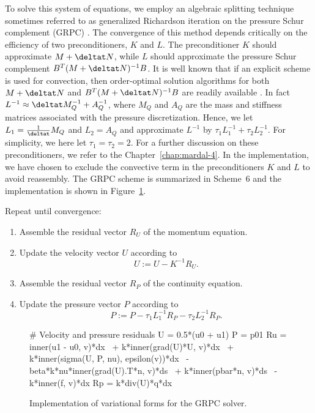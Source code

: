 To solve this system of equations, we employ an algebraic splitting
technique sometimes referred to as generalized Richardson iteration on
the pressure Schur complement (GRPC) \citep{Turek1999}. The
convergence of this method depends critically on the efficiency of two
preconditioners, $K$ and $L$. The preconditioner $K$ should
approximate $M + \deltat N$, while $L$ should approximate the
pressure Schur complement $B^T (M + \deltat N)^{-1} B$. It is well
known that if an explicit scheme is used for convection, then
order-optimal solution algorithms for both $M + \deltat N$ and $B^T (M
+ \deltat N)^{-1} B$ are readily available
\citep{CahouetChabard1988,Turek1999,MardalWinther2004,MardalWinther11}. In
fact $L^{-1} \approx \deltat M_Q^{-1} + A_Q^{-1}$, where $M_Q$ and
$A_Q$ are the mass and stiffness matrices associated with the pressure
discretization. Hence, we let $L_1=\frac{1}{\deltat} M_Q$ and
$L_2=A_Q$ and approximate $L^{-1}$ by $\tau_1 L_1^{-1} + \tau_2
L_2^{-1}$. For simplicity, we here let $\tau_1 = \tau_2 = 2$.  For a
further discussion on these preconditioners, we refer to the
Chapter~\ref{chap:mardal-4}. In the implementation, we have chosen to
exclude the convective term in the preconditioners $K$ and $L$ to
avoid reassembly.  The GRPC scheme is summarized in Scheme~6 and the
implementation is shown in Figure~\ref{fig:grpc_code}.

{
\item
  Repeat until convergence:

  \begin{enumerate}
  \item
    Assemble the residual vector $R_U$ of the momentum equation.
  \item
    Update the velocity vector $U$ according to
    \begin{equation}\label{eq:grpc,1}
      U := U - K^{-1} R_U.
    \end{equation}
  \item
    Assemble the residual vector $R_P$ of the continuity equation.
  \item
    Update the pressure vector $P$ according to
    \begin{equation}\label{eq:grpc,2}
      P := P - \tau_1 L_1^{-1} R_P - \tau_2 L_2^{-1} R_P.
    \end{equation}
  \end{enumerate}
}

\begin{figure}
  \begin{center}
    \begin{python}
# Velocity and pressure residuals
U = 0.5*(u0 + u1)
P = p01
Ru = inner(u1 - u0, v)*dx \
   + k*inner(grad(U)*U, v)*dx \
   + k*inner(sigma(U, P, nu), epsilon(v))*dx \
   - beta*k*nu*inner(grad(U).T*n, v)*ds \
   + k*inner(pbar*n, v)*ds \
   - k*inner(f, v)*dx
Rp = k*div(U)*q*dx
    \end{python}
    \caption{Implementation of variational forms for the GRPC solver.}
    \label{fig:grpc_code}
  \end{center}
\end{figure}

